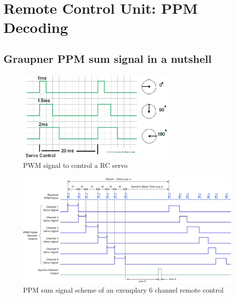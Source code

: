 \chapter{Remote Control Unit: PPM Decoding}
\label{sec:remoteControl}

\section{Graupner PPM sum signal in a nutshell}
\label{sec:remoteControl:ppmNutshell}



\begin{figure}[H]
    \centering
    \includegraphics[width=0.7\textwidth]{fig/ch-ppm-kernel-driver/graupnerPWM}
    \caption[PWM signal scheme of a RC servo \cite{doc:RPL}]{PWM signal to control a RC servo \cite{doc:RPL}}
    \label{fig:remoteControl:ppmNutshell:pwmSignal}
\end{figure}



\begin{figure}[H]
    \centering
    \includegraphics[width=\textwidth]{fig/ch-ppm-kernel-driver/graupnerPPM}
    \caption[PPM sum signal scheme \cite{doc:REP}]{PPM sum signal scheme of an exemplary 6 channel remote control \cite{doc:REP}}
    \label{fig:remoteControl:ppmNutshell:ppmSumSignal}
\end{figure}

